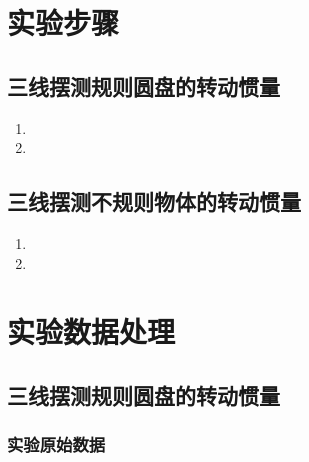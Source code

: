 \section{实验步骤}
\subsection{三线摆测规则圆盘的转动惯量}
\begin{enumerate}
    \item %
    \item %
\end{enumerate}

\subsection{三线摆测不规则物体的转动惯量}
\begin{enumerate}
    \item %
    \item %
\end{enumerate}

\section{实验数据处理}
\subsection{三线摆测规则圆盘的转动惯量}
\subsubsection{实验原始数据}


